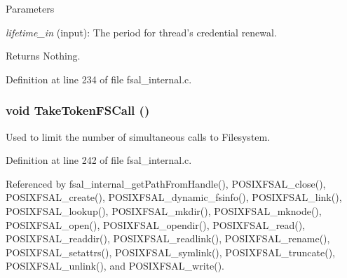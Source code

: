 \begin{DoxyParams}{Parameters}
\item[{\em lifetime\_\-in}](input): The period for thread's credential renewal.\end{DoxyParams}
\begin{DoxyReturn}{Returns}
Nothing. 
\end{DoxyReturn}


Definition at line 234 of file fsal\_\-internal.c.
\subsubsection[{TakeTokenFSCall}]{\setlength{\rightskip}{0pt plus 5cm}void TakeTokenFSCall ()}\label{fsal__internal_8c_a880a1463c400047bfd0401f0b9c431a7}
Used to limit the number of simultaneous calls to Filesystem. 

Definition at line 242 of file fsal\_\-internal.c.

Referenced by fsal\_\-internal\_\-getPathFromHandle(), POSIXFSAL\_\-close(), POSIXFSAL\_\-create(), POSIXFSAL\_\-dynamic\_\-fsinfo(), POSIXFSAL\_\-link(), POSIXFSAL\_\-lookup(), POSIXFSAL\_\-mkdir(), POSIXFSAL\_\-mknode(), POSIXFSAL\_\-open(), POSIXFSAL\_\-opendir(), POSIXFSAL\_\-read(), POSIXFSAL\_\-readdir(), POSIXFSAL\_\-readlink(), POSIXFSAL\_\-rename(), POSIXFSAL\_\-setattrs(), POSIXFSAL\_\-symlink(), POSIXFSAL\_\-truncate(), POSIXFSAL\_\-unlink(), and POSIXFSAL\_\-write().